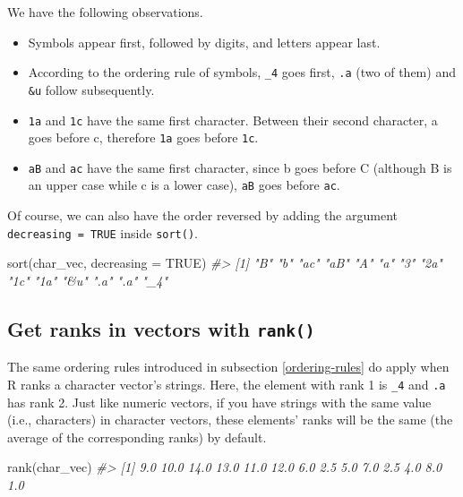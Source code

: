 \documentclass[
]{book}
\newenvironment{Shaded}{\begin{snugshade}}{\end{snugshade}}
\newcommand{\AttributeTok}[1]{\textcolor[rgb]{0.77,0.63,0.00}{#1}}
\newcommand{\CommentTok}[1]{\textcolor[rgb]{0.56,0.35,0.01}{\textit{#1}}}
\newcommand{\ConstantTok}[1]{\textcolor[rgb]{0.00,0.00,0.00}{#1}}
\newcommand{\FunctionTok}[1]{\textcolor[rgb]{0.00,0.00,0.00}{#1}}
\newcommand{\NormalTok}[1]{#1}
\providecommand{\tightlist}{%
  \setlength{\itemsep}{0pt}\setlength{\parskip}{0pt}}
\begin{document}
We have the following observations.

\begin{itemize}
\tightlist
\item
  Symbols appear first, followed by digits, and letters appear last.
\item
  According to the ordering rule of symbols, \texttt{\_4} goes first, \texttt{.a} (two of them) and \texttt{\&u} follow subsequently.
\item
  \texttt{1a} and \texttt{1c} have the same first character. Between their second character, a goes before c, therefore \texttt{1a} goes before \texttt{1c}.
\item
  \texttt{aB} and \texttt{ac} have the same first character, since b goes before C (although B is an upper case while c is a lower case), \texttt{aB} goes before \texttt{ac}.
\end{itemize}

Of course, we can also have the order reversed by adding the argument \texttt{decreasing\ =\ TRUE} inside \texttt{sort()}.

\begin{Shaded}
\begin{Highlighting}[]
\FunctionTok{sort}\NormalTok{(char\_vec, }\AttributeTok{decreasing =} \ConstantTok{TRUE}\NormalTok{)}
\CommentTok{\#\textgreater{}  [1] "B"  "b"  "ac" "aB" "A"  "a"  "3"  "2a" "1c" "1a" "\&u" ".a" ".a" "\_4"}
\end{Highlighting}
\end{Shaded}

\hypertarget{get-ranks-in-vectors-with-rank-1}{%
\subsection{\texorpdfstring{Get ranks in vectors with \texttt{rank()}}{Get ranks in vectors with rank()}}\label{get-ranks-in-vectors-with-rank-1}}

The same ordering rules introduced in subsection \ref{ordering-rules} do apply when R ranks a character vector's strings. Here, the element with rank 1 is \texttt{\_4} and \texttt{.a} has rank 2. Just like numeric vectors, if you have strings with the same value (i.e., characters) in character vectors, these elements' ranks will be the same (the average of the corresponding ranks) by default.

\begin{Shaded}
\begin{Highlighting}[]
\FunctionTok{rank}\NormalTok{(char\_vec)}
\CommentTok{\#\textgreater{}  [1]  9.0 10.0 14.0 13.0 11.0 12.0  6.0  2.5  5.0  7.0  2.5  4.0  8.0  1.0}
\end{Highlighting}
\end{Shaded}
\end{document}
